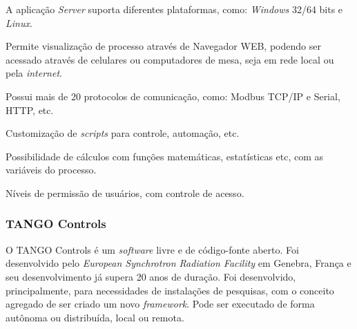     \begin{alineascomponto}
	    \item A aplicação \textit{Server} suporta diferentes plataformas, como: \textit{Windows} 32/64 bits e \textit{Linux}.
	    \item Permite visualização de processo através de Navegador \gls{WEB}, podendo ser acessado através de celulares ou computadores de mesa, seja em rede local ou pela \textit{internet}.
    	\item Possui mais de 20 protocolos de comunicação, como: Modbus \gls{TCP/IP} e Serial, \gls{HTTP}, etc.
    	\item Customização de \textit{scripts} para controle, automação, etc.
    	\item Possibilidade de cálculos com funções matemáticas, estatísticas etc, com as variáveis do processo.
    	\item Níveis de permissão de usuários, com controle de acesso.
    \end{alineascomponto}
    
\subsubsection{TANGO Controls}
\label{sec:tango}

    O TANGO Controls \cite{Tango} é um \textit{software} livre e de código-fonte aberto. Foi desenvolvido pelo \textit{European Synchrotron Radiation Facility} em Genebra, França e seu desenvolvimento já supera 20 anos de duração. Foi desenvolvido, principalmente, para necessidades de instalações de pesquisas, com o conceito agregado de ser criado um novo \textit{framework}. Pode ser executado de forma autônoma ou distribuída, local ou remota.

    \begin{figure}[!h]
    \end{figure}
    
